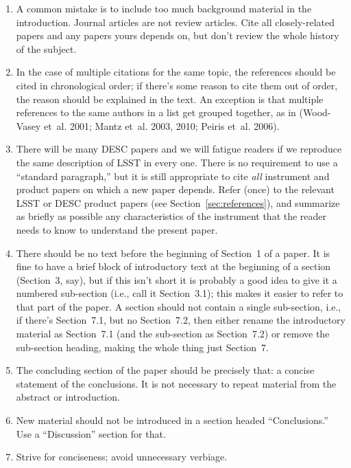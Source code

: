 \documentclass[letterpaper,11pt]{article}
\begin{document}
\begin{enumerate}

\item A common mistake is to include too much background material in the
introduction.  Journal articles are not review articles. Cite all
closely-related papers and any papers yours depends on, but don't review the
whole history of the subject.

\item In the case of multiple citations for the same topic, the references should be cited in chronological order; if there's some reason to cite them out of order, the reason should be explained in the text.
An exception is that multiple references to the same authors in a list get grouped together, as in (Wood-Vasey et~al. 2001; Mantz et~al. 2003, 2010; Peiris et~al. 2006).

\item There will be many DESC papers and we will fatigue readers if we
reproduce the same description of LSST in every one.
 There is no requirement to use a ``standard paragraph,''
but it is still appropriate to cite {\it all\/} instrument and product papers
on which a new paper depends.
Refer (once)
to the relevant LSST or DESC product papers (see Section~\ref{sec:references}), and summarize as briefly as
possible any characteristics of the instrument that the reader needs to know
to understand the present paper.

\item
There should be no text before the beginning of Section~1 of a paper.
It is fine to have a brief block of introductory text at the beginning of a
section (Section~3, say), but if this isn't short it is probably a good idea to
give it a numbered sub-section (i.e., call it Section~3.1); this makes it
easier to refer to that part of the paper.  A section should not contain a
single sub-section, i.e., if there's Section~7.1, but no Section~7.2, then
either rename the introductory material as Section~7.1 (and the sub-section
as Section~7.2) or remove the sub-section heading, making the whole thing
just Section~7.


\item The concluding section of the paper should be precisely that: a concise
statement of the conclusions.  It is not necessary to repeat material from the
abstract or introduction.

\item New material should not be introduced in a section headed
``Conclusions.''  Use a ``Discussion'' section for that.

\item Strive for conciseness; avoid unnecessary verbiage.

\end{enumerate}
\end{document}

